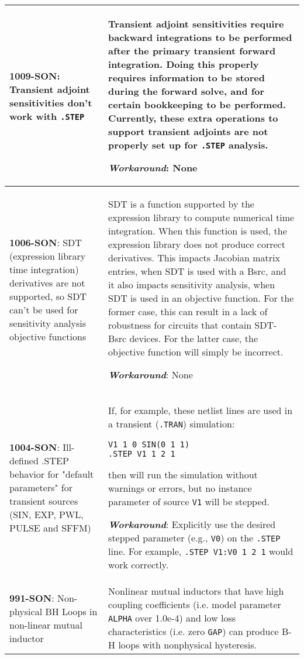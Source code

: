 {\begin{longtable}[h] {>{\raggedright\small}m{2in}|>{\raggedright\let\\\tabularnewline\small}m{3.5in}}
  \textbf{1009-SON}:  Transient adjoint sensitivities don't work with \texttt{.STEP}
  & Transient adjoint sensitivities require backward integrations to be performed after the primary transient forward integration.  Doing this properly requires information to be stored during the forward solve, and for certain bookkeeping to be performed.  Currently, these extra operations to support transient adjoints are not properly set up for \texttt{.STEP} analysis.

\textbf{\textit{Workaround}}: None
\\ \hline

  \textbf{1006-SON}:   SDT (expression library time integration) derivatives are not supported, so SDT can't be used for sensitivity analysis objective functions &
  SDT is a function supported by the \Xyce{} expression library to compute numerical time integration.  When this function is used, the expression library does not produce correct derivatives.  This impacts Jacobian matrix entries, when SDT is used with a Bsrc, and it also impacts sensitivity analysis, when SDT is used in an objective function.  For the former case, this can result in a lack of robustness for circuits that contain SDT-Bsrc devices.  For the latter case, the objective function will simply be incorrect.

\textbf{\textit{Workaround}}: None
\\ \hline

\textbf{1004-SON}: Ill-defined .STEP behavior for "default parameters" for 
transient sources (SIN, EXP, PWL, PULSE and SFFM) & If, for example,
these netlist lines are used in a transient (\texttt{.TRAN}) simulation:
\begin{verbatim}
V1 1 0 SIN(0 1 1)
.STEP V1 1 2 1
\end{verbatim}
then \Xyce{} will run the simulation without warnings or errors, but
no instance parameter of source \texttt{V1} will be stepped.  

\textbf{\textit{Workaround}}: Explicitly use the desired stepped parameter
(e.g., \texttt{V0}) on the \texttt{.STEP} line.  For example, 
\texttt{.STEP V1:V0 1 2 1} would work correctly.
\\ \hline

\textbf{991-SON}: Non-physical BH Loops in non-linear mutual inductor &
Nonlinear mutual inductors that have high coupling coefficients (i.e. 
model parameter \texttt{ALPHA} over 1.0e-4) and low loss characteristics 
(i.e. zero \texttt{GAP}) can produce B-H loops with nonphysical hysteresis.


\end{longtable}}
